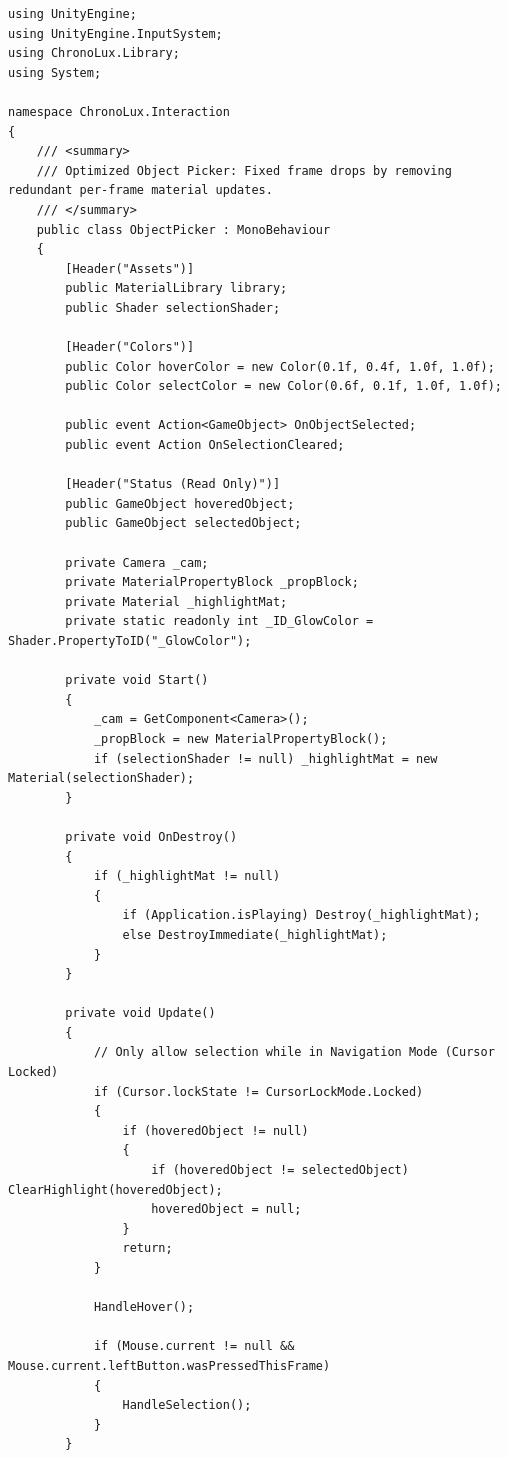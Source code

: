 \begin{lstlisting}[language={[Sharp]C}, caption={ObjectPicker.cs: Crosshair-based physical material editor and artifact interaction logic.}, label={lst:objectpicker}]
using UnityEngine;
using UnityEngine.InputSystem;
using ChronoLux.Library;
using System;

namespace ChronoLux.Interaction
{
    /// <summary>
    /// Optimized Object Picker: Fixed frame drops by removing redundant per-frame material updates.
    /// </summary>
    public class ObjectPicker : MonoBehaviour
    {
        [Header("Assets")]
        public MaterialLibrary library;
        public Shader selectionShader;

        [Header("Colors")]
        public Color hoverColor = new Color(0.1f, 0.4f, 1.0f, 1.0f);
        public Color selectColor = new Color(0.6f, 0.1f, 1.0f, 1.0f);

        public event Action<GameObject> OnObjectSelected;
        public event Action OnSelectionCleared;

        [Header("Status (Read Only)")]
        public GameObject hoveredObject;
        public GameObject selectedObject;
        
        private Camera _cam;
        private MaterialPropertyBlock _propBlock;
        private Material _highlightMat;
        private static readonly int _ID_GlowColor = Shader.PropertyToID("_GlowColor");

        private void Start()
        {
            _cam = GetComponent<Camera>();
            _propBlock = new MaterialPropertyBlock();
            if (selectionShader != null) _highlightMat = new Material(selectionShader);
        }

        private void OnDestroy()
        {
            if (_highlightMat != null)
            {
                if (Application.isPlaying) Destroy(_highlightMat);
                else DestroyImmediate(_highlightMat);
            }
        }

        private void Update()
        {
            // Only allow selection while in Navigation Mode (Cursor Locked)
            if (Cursor.lockState != CursorLockMode.Locked)
            {
                if (hoveredObject != null)
                {
                    if (hoveredObject != selectedObject) ClearHighlight(hoveredObject);
                    hoveredObject = null;
                }
                return;
            }

            HandleHover();

            if (Mouse.current != null && Mouse.current.leftButton.wasPressedThisFrame)
            {
                HandleSelection();
            }
        }


\end{lstlisting}
